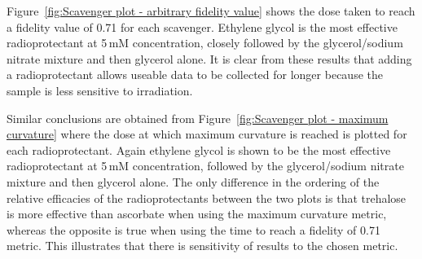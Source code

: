 Figure~\ref{fig:Scavenger plot - arbitrary fidelity value} shows the dose taken to reach a fidelity value of 0.71 for each scavenger. Ethylene glycol is the most effective radioprotectant at 5$\,$mM concentration, closely followed by the glycerol/sodium nitrate mixture and then glycerol alone. It is clear from these results that adding a radioprotectant allows useable data to be collected for longer because the sample is less sensitive to irradiation.

Similar conclusions are obtained from Figure~\ref{fig:Scavenger plot - maximum curvature} where the dose at which maximum curvature is reached is plotted for each radioprotectant. Again ethylene glycol is shown to be the most effective radioprotectant at 5\,mM concentration, followed by the glycerol/sodium nitrate mixture and then glycerol alone. The only difference in the ordering of the relative efficacies of the radioprotectants between the two plots is that trehalose is more effective than ascorbate when using the maximum curvature metric, whereas the opposite is true when using the time to reach a fidelity of 0.71 metric.
This illustrates that there is sensitivity of results to the chosen metric.
